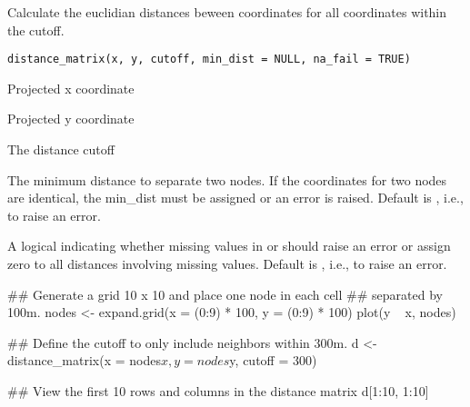 \documentclass[letterpaper]{book}
\begin{document}
%
\begin{Description}
Calculate the euclidian distances beween coordinates for all
coordinates within the cutoff.
\end{Description}
%
\begin{Usage}
\begin{verbatim}
distance_matrix(x, y, cutoff, min_dist = NULL, na_fail = TRUE)
\end{verbatim}
\end{Usage}
%
\begin{Arguments}
\begin{ldescription}
\item[\code{x}] Projected x coordinate

\item[\code{y}] Projected y coordinate

\item[\code{cutoff}] The distance cutoff

\item[\code{min\_dist}] The minimum distance to separate two nodes.  If
the coordinates for two nodes are identical, the min\_dist must
be assigned or an error is raised.  Default is ,
i.e., to raise an error.

\item[\code{na\_fail}] A logical indicating whether missing values in
 or  should raise an error or assign zero to
all distances involving missing values.  Default is
, i.e., to raise an error.
\end{ldescription}
\end{Arguments}
%
\begin{Value}
\end{Value}
%
\begin{Examples}
\begin{ExampleCode}
## Generate a grid 10 x 10 and place one node in each cell
## separated by 100m.
nodes <- expand.grid(x = (0:9) * 100, y = (0:9) * 100)
plot(y ~ x, nodes)

## Define the cutoff to only include neighbors within 300m.
d <- distance_matrix(x = nodes$x, y = nodes$y, cutoff = 300)

## View the first 10 rows and columns in the distance matrix
d[1:10, 1:10]
\end{ExampleCode}
\end{Examples}
\end{document}
